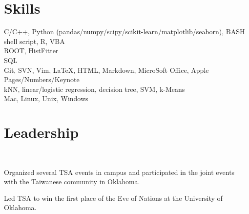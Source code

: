 \documentclass[letterpaper]{deedy-resume-openfont}
\begin{document}
\section{Skills}

C/C++, Python (pandas/numpy/scipy/scikit-learn/matplotlib/seaborn), BASH shell script, R, VBA\\
ROOT, HistFitter\\
SQL\\
Git, SVN, Vim, \LaTeX, HTML, Markdown, MicroSoft Office, Apple Pages/Numbers/Keynote\\
kNN, linear/logistic regression, decision tree, SVM, k-Means\\
Mac, Linux, Unix, Windows\\
\sectionsep



\section{Leadership}

\\
\begin{tightemize}
\item Organized several TSA events in campus and participated in the joint events with the Taiwanese community in Oklahoma.
\item Led TSA to win the first place of the Eve of Nations at the University of Oklahoma.
\end{tightemize}
\sectionsep
\end{document}
